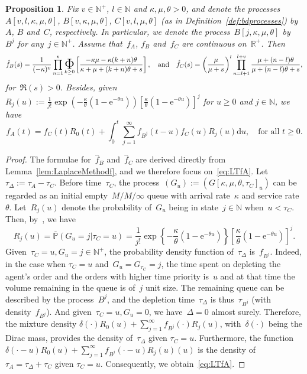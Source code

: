 \documentclass{amsart}[11pt]
\numberwithin{equation}{section}
\newtheorem{proposition}[theorem]{Proposition}
\theoremstyle{definition}
\newcommand{\RR}{\mathbb{R}}
\newcommand{\PP}{\mathbb{P}}
\newcommand{\NN}{\mathbb{N}}
\newcommand{\D}{\mathrm{d}}
\newcommand{\E}{\mathrm{e}}
\DeclareMathOperator*{\foo}{\text{\raisebox{-0.7ex}{\huge $\Phi$}}}
\begin{document}
\begin{proposition}\label{prop:Laplace}
Fix $v\in\NN^+$, $l\in\NN$ and $\kappa, \mu, \theta >0$, and denote the processes
$A[v, l, \kappa, \mu, \theta]$, $B[v, \kappa, \mu, \theta]$, $C[v, l, \mu, \theta]$ 
(as in Definition~\ref{def:bdprocesses})
by~$A$, $B$ and~$C$, respectively.
In particular, we denote the process~$B[j, \kappa, \mu, \theta]$ by~$B^j$ for any~$j\in\NN^+$.
Assume that~$f_{A}$, $f_{B}$ and~$f_{C}$ are continuous on~$\RR^+$.
Then 
$$
\hat{f}_{{B}}(s) = \frac{1}{(-\kappa)^{v}}\prod_{n = 1}^v
\foo_{k\geq 0}
\left[\frac{-\kappa\mu-\kappa(k+n)\theta}{\kappa + \mu + (k+n)\theta + s}\right],
\quad\text{and}\quad
\hat{f}_{C}(s) = \left(\frac{\mu}{\mu+s}\right)^l
\prod_{n = l+1}^{l+v}\frac{\mu + (n - l)\theta}{\mu + (n-l)\theta + s},
$$
for~$\Re(s)>0$.
Besides, given
$
R_j(u) := \frac{1}{j!}
\exp\left(   -\frac{\kappa}{\theta}\left(1 - \E^{-\theta u}\right)   \right)
\left[\displaystyle\frac{\kappa}{\theta}\left(1 - \E^{-\theta u}\right) \right]^j$
for $u\geq 0$ and $j\in\NN$,
we have
\begin{equation}\label{eq:LTfA}
f_{A}(t) = f_{C}(t)R_0(t) + \int_0^t\sum_{j=1}^{\infty}f_{B^j}(t - u)f_{C}(u) R_j(u)\D u,\quad\text{for all }t\geq0.
\end{equation}
\end{proposition}
\begin{proof}
The formulae for~$\hat{f}_B$ and~$\hat{f}_C$
are derived directly from Lemma~\ref{lem:LaplaceMethodf}, 
and we therefore focus on~\eqref{eq:LTfA}.
Let~$\tau_\Delta := \tau_A - \tau_{C}$.
Before time~$\tau_{C}$, the process~$(G_u) := (G[\kappa, \mu, \theta, \tau_C]_u)$ 
can be regarded as an initial empty~$M/M/\infty$ queue with arrival rate~$\kappa$ 
and service rate~$\theta$.
Let~$R_j(u)$ denote the probability of~$G_u$ being in state~$j\in\NN$
when~$u<\tau_C$.
Then, by~\cite[p. 160]{takacs1959introduction}, we have
\begin{equation*}
R_j(u) = \overline{\PP}\left(G_u = j \Big\lvert\tau_C = u\right)
= \frac{1}{j!}
\exp\left\{-\frac{\kappa}{\theta}\left(1 - \E^{-\theta u}\right)\right\}
\left[ \displaystyle\frac{\kappa}{\theta}\left(1 - \E^{-\theta u}\right) \right]^j.
\end{equation*}
Given~$\tau_C = u, G_u = j\in\NN^+$, the probability density function of~$\tau_\Delta$ is~$f_{B^j}$.
Indeed, in the case when $\tau_C = u$ and~$G_u = G_{\tau_C} = j$,
the time spent on depleting the agent's order and the orders with higher time priority is~$u$
and at that time the volume remaining in the queue is of~$j$ unit size.
The remaining queue can be described by the process~$B^j$, and the depletion time~$\tau_\Delta$ is thus~$\tau_{B^j}$ 
(with density~$f_{B^j}$).
And given~$\tau_C = u, G_u = 0$, we have~$\Delta = 0$ almost surely. 
Therefore, the mixture density 
$\delta(\cdot)R_0(u) + \sum_{j=1}^{\infty}f_{B^j}(\cdot)R_j(u)$,
with~$\delta(\cdot)$ being the Dirac mass, 
provides the density of~$\tau_\Delta$
given $\tau_C = u$.
Furthermore, the function
$\delta(\cdot - u)R_0(u) + \sum_{j=1}^{\infty}f_{B^j}(\cdot - u)R_j(u)(u)$
is the density of $\tau_A = \tau_\Delta + \tau_{C}$ given $\tau_{C} = u$.
Consequently, we obtain~\eqref{eq:LTfA}.
\end{proof}
\end{document}
